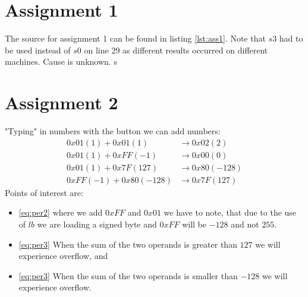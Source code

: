 \section{Assignment 1}
The source for assignment 1 can be found in listing \ref{lst:ass1}. Note that
$s3$ had to be used instead of $s0$ on line 29 as different results occurred on
different machines. Cause is unknown.
s

\section{Assignment 2}
"Typing" in numbers with the button we can add numbers:
\begin{align}
0x01 (1) + 0x01 (1) &\rightarrow 0x02 (2)\label{eq:per1}\\
0x01 (1) + 0xFF (-1) &\rightarrow 0x00 (0)\label{eq:per2}\\
0x01 (1) + 0x7F (127) &\rightarrow 0x80 (-128)\label{eq:per3}\\
0xFF (-1) + 0x80 (-128) &\rightarrow 0x7F (127)\label{eq:per4}
\end{align}
Points of interest are:
\begin{itemize}
\item
\eqref{eq:per2} where we add $0xFF$ and $0x01$ we have to note, that due to the use of $lb$ we are loading a signed byte and $0xFF$ will be $-128$ and not $255$.
\item
\eqref{eq:per3} When the sum of the two operands is greater than $127$ we will experience overflow, and
\item
\eqref{eq:per3} When the sum of the two operands is smaller than $-128$ we will experience overflow.
\end{itemize}